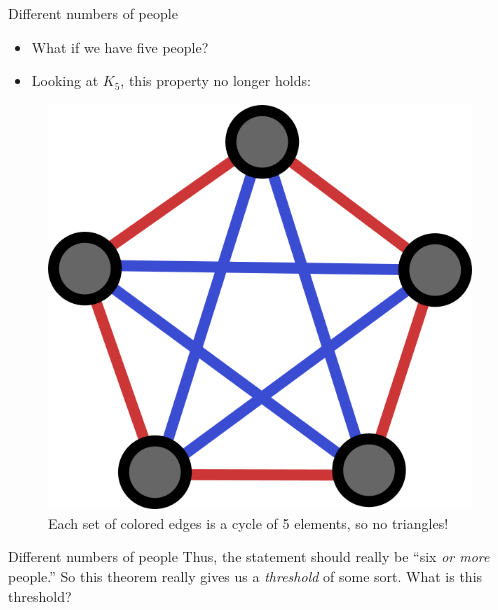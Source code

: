 \documentclass[aspectratio=169]{beamer}
\begin{document}
\begin{frame}{Different numbers of people}
    \begin{itemize}
        \item What if we have five people? \pause
        \item Looking at $K_5$, this property no longer holds:
    \end{itemize}
    \begin{figure}
        \centering
        \includegraphics[width=0.3\columnwidth]{images/k5.png}
        \caption{Each set of colored edges is a cycle of 5 elements, so no triangles!}
    \end{figure}
\end{frame}

\begin{frame}{Different numbers of people}
    Thus, the statement should really be ``six \textit{or more} people.'' So this theorem really gives us a \textit{threshold} of some sort. What is this threshold?
\end{frame}
\end{document}
